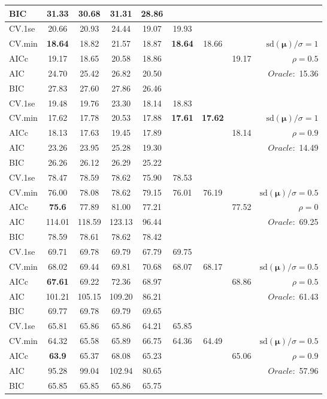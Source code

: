 \begin{table}
\begin{center}
\begin{tabular}{l*{7}{c}|r}
BIC & 31.33 & 30.68 & 31.31 & 28.86 & & & &  \\
 \hline 
CV.1se & 20.66 & 20.93 & 24.44 & 19.07 & 19.93 & & & \\
CV.min & {\bf 18.64} & 18.82 & 21.57 & 18.87 & {\bf 18.64} & 18.66 & & $\mathrm{sd}(\mathbf{\mu})/\sigma=1$ \\
AICc & 19.17 & 18.65 & 20.58 & 18.86 & & & 19.17 &  $\rho=0.5$ \\
AIC & 24.70 & 25.42 & 26.82 & 20.50 & & & &  \multirow{2}{*}{$Oracle: $ 15.36} \\
BIC & 27.83 & 27.60 & 27.86 & 26.46 & & & &  \\
 \hline 
CV.1se & 19.48 & 19.76 & 23.30 & 18.14 & 18.83 & & & \\
CV.min & 17.62 & 17.78 & 20.53 & 17.88 & {\bf 17.61} & {\bf 17.62} & & $\mathrm{sd}(\mathbf{\mu})/\sigma=1$ \\
AICc & 18.13 & 17.63 & 19.45 & 17.89 & & & 18.14 &  $\rho=0.9$ \\
AIC & 23.26 & 23.95 & 25.28 & 19.30 & & & &  \multirow{2}{*}{$Oracle: $ 14.49} \\
BIC & 26.26 & 26.12 & 26.29 & 25.22 & & & &  \\
 \hline 
CV.1se & 78.47 & 78.59 & 78.62 & 75.90 & 78.53 & & & \\
CV.min & 76.00 & 78.08 & 78.62 & 79.15 & 76.01 & 76.19 & & $\mathrm{sd}(\mathbf{\mu})/\sigma=0.5$ \\
AICc & {\bf 75.6} & 77.89 & 81.00 & 77.21 & & & 77.52 &  $\rho=0$ \\
AIC & 114.01 & 118.59 & 123.13 & 96.44 & & & &  \multirow{2}{*}{$Oracle: $ 69.25} \\
BIC & 78.59 & 78.61 & 78.62 & 78.42 & & & &  \\
 \hline 
CV.1se & 69.71 & 69.78 & 69.79 & 67.79 & 69.75 & & & \\
CV.min & 68.02 & 69.44 & 69.81 & 70.68 & 68.07 & 68.17 & & $\mathrm{sd}(\mathbf{\mu})/\sigma=0.5$ \\
AICc & {\bf 67.61} & 69.22 & 72.36 & 68.97 & & & 68.86 &  $\rho=0.5$ \\
AIC & 101.21 & 105.15 & 109.20 & 86.21 & & & &  \multirow{2}{*}{$Oracle: $ 61.43} \\
BIC & 69.77 & 69.78 & 69.79 & 69.65 & & & &  \\
 \hline 
CV.1se & 65.81 & 65.86 & 65.86 & 64.21 & 65.85 & & & \\
CV.min & 64.32 & 65.58 & 65.89 & 66.75 & 64.36 & 64.49 & & $\mathrm{sd}(\mathbf{\mu})/\sigma=0.5$ \\
AICc & {\bf 63.9} & 65.37 & 68.08 & 65.23 & & & 65.06 &  $\rho=0.9$ \\
AIC & 95.28 & 99.04 & 102.94 & 80.65 & & & &  \multirow{2}{*}{$Oracle: $ 57.96} \\
BIC & 65.85 & 65.85 & 65.86 & 65.75 & & & &  \\
 \hline 
\end{tabular}
\end{center}
\vspace{-1cm}
\end{table}





